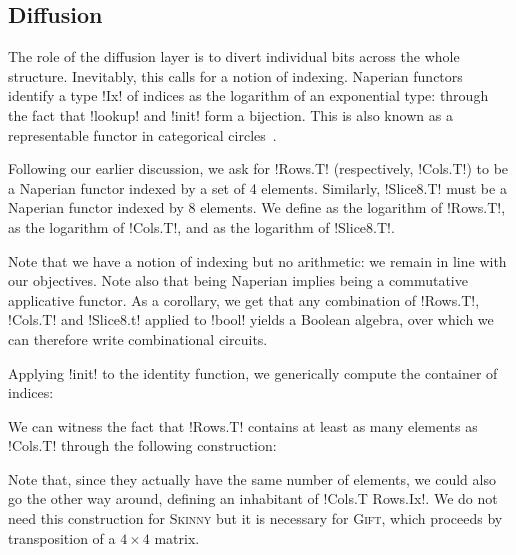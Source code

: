 \documentclass[draft,english]{jflart}
\newcommand{\Skinny}{\textsc{Skinny}}
\newcommand{\Gift}{\textsc{Gift}}
\begin{document}
\subsection{Diffusion}


The role of the diffusion layer is to divert individual bits across the
whole structure. Inevitably, this calls for a notion of indexing.
Naperian functors~\citep{hancock:napierian} identify a type \coqe!Ix! of
indices as the logarithm of an exponential type:
%
%
through the fact that \coqe!lookup! and \coqe!init! form a bijection.
This is also known as a representable functor in categorical
circles~\citep{maclane:working-categorist}.


Following our earlier discussion, we ask for \coqe!Rows.T!
(respectively, \coqe!Cols.T!) to be a Naperian functor indexed by a
set of 4 elements. Similarly, \coqe!Slice8.T! must be a Naperian
functor indexed by 8 elements. We define
%
%
as the logarithm of \coqe!Rows.T!,
%
%
as the logarithm of \coqe!Cols.T!, and
%
%
as the logarithm of \coqe!Slice8.T!.

Note that we have a notion of indexing but no arithmetic: we remain in
line with our objectives. Note also that being Naperian implies being
a commutative applicative functor. As a corollary, we get that any
combination of \coqe!Rows.T!, \coqe!Cols.T! and \coqe!Slice8.t!
applied to \coqe!bool! yields a Boolean algebra, over which we can
therefore write combinational circuits.


Applying \coqe!init! to the identity function, we generically compute
the container of indices:
%

We can witness the fact that \coqe!Rows.T! contains at least as many
elements as \coqe!Cols.T! through the following construction:
%

Note that, since they actually have the same number of elements, we
could also go the other way around, defining an inhabitant of
\coqe!Cols.T Rows.Ix!. We do not need this construction for \Skinny{}
but it is necessary for \Gift{}, which proceeds by transposition of a
$4 \times 4$ matrix.
\end{document}
